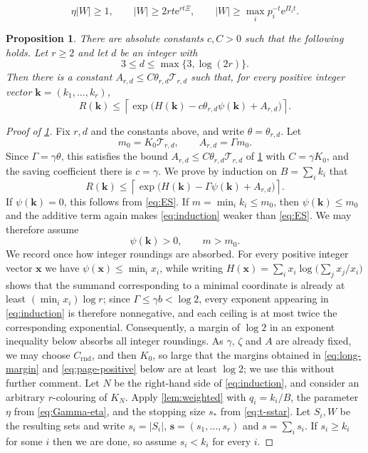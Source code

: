 \documentclass[10pt,a4paper]{amsart}
\newtheorem{proposition}{Proposition}
\newcommand{\Ent}{H}
\newcommand{\e}{\mathrm e}
\newcommand{\kk}{\mathbf k}
\newcommand{\pot}{\psi}
\newcommand{\ssv}{\mathbf s}
\begin{document}
\begin{equation}
 \eta|W|\ge1,
 \qquad
 |W|\ge2rt\e^{rt\Xi},
 \qquad
 |W|\ge\max_i p_i^{-t}\e^{\Pi_it}.
\end{equation}

\begin{proposition}\label{thm:offdiag-flex}
There are absolute constants $c,C>0$ such that the following holds.  Let
$r\ge2$ and let $d$ be an integer with
\[
 3\le d\le\max\{3,\log(2r)\}.
\]
Then there is a constant $A_{r,d}\le C\theta_{r,d}\mathcal T_{r,d}$ such that,
for every positive integer vector $\kk=(k_1,\ldots,k_r)$,
\[
 R(\kk)\le
 \left\lceil
 \exp\bigl(\Ent(\kk)-c\theta_{r,d}\pot(\kk)+A_{r,d}\bigr)
 \right\rceil.
\]
\end{proposition}

\begin{proof}[Proof of \cref{thm:offdiag-flex}]
Fix $r,d$ and the constants above, and write
$\theta=\theta_{r,d}$.  Let
\[
 m_0=K_0\mathcal T_{r,d},
 \qquad
 A_{r,d}=\Gamma m_0.
\]
Since $\Gamma=\gamma\theta$, this satisfies the bound
$A_{r,d}\le C\theta_{r,d}\mathcal T_{r,d}$ of \cref{thm:offdiag-flex} with
$C=\gamma K_0$, and the saving coefficient there is $c=\gamma$.  We prove by
induction on $B=\sum_i k_i$ that
\begin{equation}\label{eq:induction}
 R(\kk)\le
 \left\lceil\exp\bigl(\Ent(\kk)-\Gamma\pot(\kk)+A_{r,d}\bigr)\right\rceil.
\end{equation}
If $\pot(\kk)=0$, this follows from \eqref{eq:ES}.  If
$m=\min_i k_i\le m_0$, then $\pot(\kk)\le m_0$ and the additive term again
makes \eqref{eq:induction} weaker than \eqref{eq:ES}.  We may therefore assume
\[
 \pot(\kk)>0,
 \qquad m>m_0.
\]
We record once how integer roundings are absorbed.  For every positive
integer vector $\mathbf x$ we have $\pot(\mathbf x)\le\min_ix_i$, while
writing $\Ent(\mathbf x)=\sum_ix_i\log\bigl(\sum_jx_j/x_i\bigr)$ shows that
the summand corresponding to a minimal coordinate is already at least
$(\min_ix_i)\log r$; since $\Gamma\le\gamma b<\log2$, every exponent
appearing in \eqref{eq:induction} is therefore nonnegative, and each ceiling
is at most twice the corresponding exponential.  Consequently, a margin of
$\log2$ in an exponent inequality below absorbs all integer roundings.  As
$\gamma$, $\zeta$ and $A$ are already fixed, we may choose
$C_{\mathrm{rnd}}$, and then $K_0$, so large that the margins obtained in
\eqref{eq:long-margin} and \eqref{eq:page-positive} below are at least
$\log2$; we use this without further comment.
Let $N$ be the right-hand side of \eqref{eq:induction}, and consider an
arbitrary $r$-colouring of $K_N$.  Apply \cref{lem:weighted} with
$q_i=k_i/B$, the parameter $\eta$ from \eqref{eq:Gamma-eta}, and the stopping
size $s_\ast$ from \eqref{eq:t-sstar}.  Let $S_i,W$ be the resulting sets and
write $s_i=|S_i|$, $\ssv=(s_1,\ldots,s_r)$ and $s=\sum_i s_i$.  If $s_i\ge k_i$ for some $i$ then we are
done, so assume $s_i<k_i$ for every $i$.


\end{proof}
\end{document}
